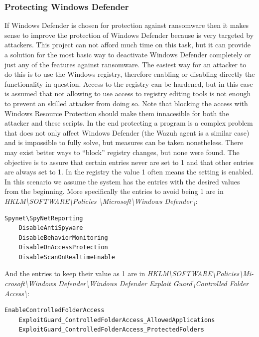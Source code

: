 \subsubsection{Protecting Windows Defender}
If Windows Defender is chosen for protection against ransomware then it makes sense to improve the protection of Windows Defender because is very targeted by attackers.
This project can not afford much time on this task, but it can provide a solution for the most basic way to deactivate Windows Defender completely or just any of the features against ransomware.
The easiest way for an attacker to do this is to use the Windows registry, therefore enabling or disabling directly the functionality in question.
\linej
Access to the registry can be hardened, but in this case is assumed that not allowing to use access to registry editing tools is not enough to prevent an skilled attacker from doing so.
Note that blocking the access with Windows Resource Protection should make them innacesible for both the attacker and these scripts.
\linej
In the end protecting a program is a complex problem that does not only affect Windows Defender (the Wazuh agent is a similar case) and is impossible to fully solve, but measures can be taken nonetheless.
\linej
\linej
There may exist better ways to ``block'' registry changes, but none were found.
The objective is to assure that certain entries never are set to 1 and that other entries are always set to 1.
In the registry the value 1 often means the setting is enabled.
In this scenario we assume the system has the entries with the desired values from the beginning.
\linej
More specifically the entries to avoid being 1 are in \textit{HKLM{\textbackslash}SOFTWARE{\textbackslash}Policies {\textbackslash}Microsoft{\textbackslash}Windows Defender{\textbackslash}}:
\begin{lstlisting}[style=xml,frame=none]
	Spynet\SpyNetReporting
	DisableAntiSpyware
	DisableBehaviorMonitoring
	DisableOnAccessProtection
	DisableScanOnRealtimeEnable
\end{lstlisting}
\linej
And the entries to keep their value as 1 are in \textit{HKLM{\textbackslash}SOFTWARE{\textbackslash}Policies{\textbackslash}Mi- crosoft{\textbackslash}Windows Defender{\textbackslash}Windows Defender Exploit Guard{\textbackslash}Controlled Folder Access{\textbackslash}}:
\begin{lstlisting}[style=xml,frame=none]
	EnableControlledFolderAccess
	ExploitGuard_ControlledFolderAccess_AllowedApplications
	ExploitGuard_ControlledFolderAccess_ProtectedFolders
\end{lstlisting}
